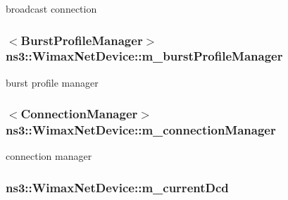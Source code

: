 broadcast connection 

\subsubsection[{\texorpdfstring{m\+\_\+burst\+Profile\+Manager}{m_burstProfileManager}}]{$<${\bf Burst\+Profile\+Manager}$>$ ns3\+::\+Wimax\+Net\+Device\+::m\+\_\+burst\+Profile\+Manager\hspace{0.3cm}{\ttfamily [private]}}\hypertarget{classns3_1_1WimaxNetDevice_a11d983c009fb78f70e01b67a06400e8f}{}\label{classns3_1_1WimaxNetDevice_a11d983c009fb78f70e01b67a06400e8f}


burst profile manager 

\subsubsection[{\texorpdfstring{m\+\_\+connection\+Manager}{m_connectionManager}}]{$<${\bf Connection\+Manager}$>$ ns3\+::\+Wimax\+Net\+Device\+::m\+\_\+connection\+Manager\hspace{0.3cm}{\ttfamily [private]}}\hypertarget{classns3_1_1WimaxNetDevice_a7b49b2dfb4fcf9f10879d306ee5d8d69}{}\label{classns3_1_1WimaxNetDevice_a7b49b2dfb4fcf9f10879d306ee5d8d69}


connection manager 

\subsubsection[{\texorpdfstring{m\+\_\+current\+Dcd}{m_currentDcd}}]{ ns3\+::\+Wimax\+Net\+Device\+::m\+\_\+current\+Dcd\hspace{0.3cm}{\ttfamily [private]}}\hypertarget{classns3_1_1WimaxNetDevice_aa88c79e9279fa4a37ee1caea7d3096df}{}\label{classns3_1_1WimaxNetDevice_aa88c79e9279fa4a37ee1caea7d3096df}


